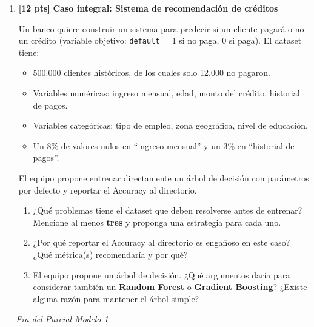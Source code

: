 \documentclass[11pt,a4paper]{article}
\newcommand{\puntaje}[1]{\textbf{[#1 pts]}}
\begin{document}
\begin{enumerate}[label=\textbf{\arabic*.}, leftmargin=*, itemsep=10pt]
\item \puntaje{12} \textbf{Caso integral: Sistema de recomendaci\'on de cr\'editos}

Un banco quiere construir un sistema para predecir si un cliente pagar\'a o no un cr\'edito (variable objetivo: \texttt{default} = 1 si no paga, 0 si paga). El dataset tiene:
\begin{itemize}
  \item 500.000 clientes hist\'oricos, de los cuales solo 12.000 no pagaron.
  \item Variables num\'ericas: ingreso mensual, edad, monto del cr\'edito, historial de pagos.
  \item Variables categ\'oricas: tipo de empleo, zona geogr\'afica, nivel de educaci\'on.
  \item Un 8\% de valores nulos en ``ingreso mensual'' y un 3\% en ``historial de pagos''.
\end{itemize}

El equipo propone entrenar directamente un \'arbol de decisi\'on con par\'ametros por defecto y reportar el Accuracy al directorio.

\begin{enumerate}[label=\textbf{\alph*)}]
  \item ¿Qu\'e problemas tiene el dataset que deben resolverse antes de entrenar? Mencione al menos \textbf{tres} y proponga una estrategia para cada uno.
  \vspace{4cm}
  \item ¿Por qu\'e reportar el Accuracy al directorio es enga\~noso en este caso? ¿Qu\'e m\'etrica(s) recomendar\'ia y por qu\'e?
  \vspace{3.5cm}
  \item El equipo propone un \'arbol de decisi\'on. ¿Qu\'e argumentos dar\'ia para considerar tambi\'en un \textbf{Random Forest} o \textbf{Gradient Boosting}? ¿Existe alguna raz\'on para mantener el \'arbol simple?
  \vspace{3.5cm}
\end{enumerate}

\end{enumerate}

\vspace{1cm}
\begin{center}
\textit{--- Fin del Parcial Modelo 1 ---}
\end{center}
\end{document}
